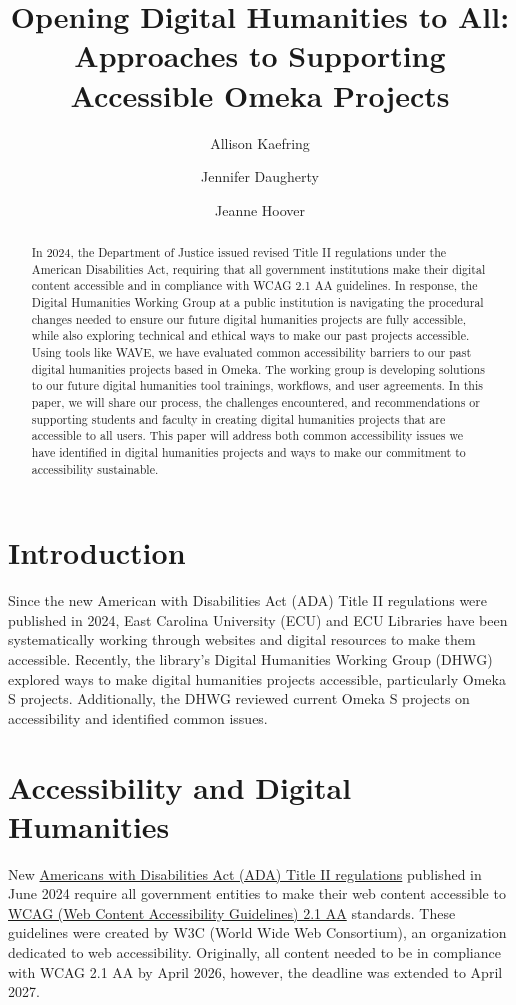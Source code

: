 \documentclass[final]{anthology-ch}
\title{Opening Digital Humanities to All: Approaches to Supporting Accessible Omeka Projects}
\author[1]{Allison Kaefring}[
  orcid=0009-0006-3805-7303
]
\author[1]{Jennifer Daugherty}[
  orcid=0009-0001-3189-7944
]
\author[1]{Jeanne Hoover}[
  orcid=0000-0003-3259-3640
]
\affiliation{1}{East Carolina University, Greenville, NC, USA}
\begin{document}
\maketitle

\begin{abstract}
In 2024, the Department of Justice issued revised Title II regulations under the American Disabilities Act, requiring that all government institutions make their digital content accessible and in compliance with WCAG 2.1 AA guidelines. In response, the Digital Humanities Working Group at a public institution is navigating the procedural changes needed to ensure our future digital humanities projects are fully accessible, while also exploring technical and ethical ways to make our past projects accessible. Using tools like WAVE, we have evaluated common accessibility barriers to our past digital humanities projects based in Omeka. The working group is developing solutions to our future digital humanities tool trainings, workflows, and user agreements. In this paper, we will share our process, the challenges encountered, and recommendations or supporting students and faculty in creating digital humanities projects that are accessible to all users. This paper will address both common accessibility issues we have identified in digital humanities projects and ways to make our commitment to accessibility sustainable.
\end{abstract}

\section{Introduction} \label{sec:intro}

Since the new American with Disabilities Act (ADA) Title II regulations \cite{doj2024ada} were published in 2024, East Carolina University (ECU) and ECU Libraries have been systematically working through websites and digital resources to make them accessible. Recently, the library's Digital Humanities Working Group (DHWG) explored ways to make digital humanities projects accessible, particularly Omeka S projects. Additionally, the DHWG reviewed current Omeka S projects on accessibility and identified common issues.

\section{Accessibility and Digital Humanities} \label{sec:accessibility}

New \href{https://www.ada.gov/law-and-regs/regulations/title-ii-2010-regulations/}{Americans with Disabilities Act (ADA) Title II regulations} \cite{doj2024ada} published in June 2024 require all government entities to make their web content accessible to \href{https://www.w3.org/TR/WCAG21/}{WCAG (Web Content Accessibility Guidelines) 2.1 AA} \cite{w3c2025wcag} standards. These guidelines were created by W3C (World Wide Web Consortium), an organization dedicated to web accessibility. Originally, all content needed to be in compliance with WCAG 2.1 AA by April 2026, however, the deadline was extended to April 2027.
\end{document}
